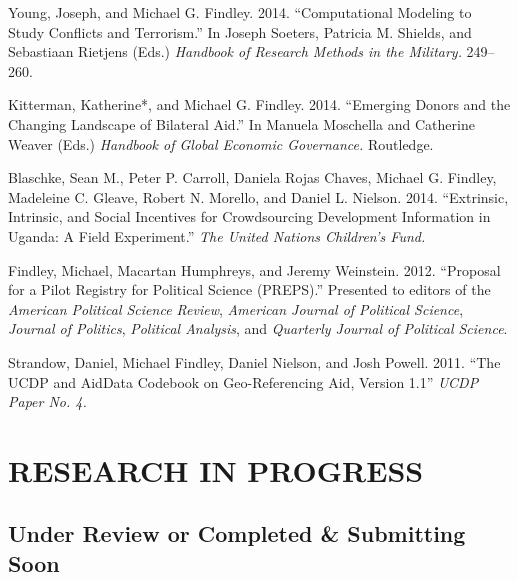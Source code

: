 \documentclass[10pt]{article}
\begin{document}
\begin{etaremune}
\item Young, Joseph, and Michael G. Findley. 2014. ``Computational Modeling to Study Conflicts and Terrorism.'' In Joseph Soeters, Patricia M. Shields, and Sebastiaan Rietjens (Eds.)  \textit{Handbook of Research Methods in the Military.} 249--260.   

\item Kitterman, Katherine*, and Michael G. Findley. 2014. ``Emerging Donors and the Changing Landscape of Bilateral Aid.'' In Manuela Moschella and Catherine Weaver (Eds.)  \textit{Handbook of Global Economic Governance.} Routledge.

\item Blaschke, Sean M., Peter P. Carroll, Daniela Rojas Chaves, Michael G. Findley, Madeleine C. Gleave, Robert N. Morello, and Daniel L. Nielson. 2014. ``Extrinsic, Intrinsic, and Social Incentives for Crowdsourcing Development Information in Uganda: A Field Experiment.'' \textit{The United Nations Children's Fund.}

\item Findley, Michael, Macartan Humphreys, and Jeremy Weinstein. 2012. ``Proposal for a Pilot Registry for Political Science (PREPS).'' Presented to editors of the \textit{American Political Science Review}, \textit{American Journal of Political Science}, \textit{Journal of Politics}, \textit{Political Analysis}, and \textit{Quarterly Journal of Political Science}.

\item Strandow, Daniel, Michael Findley, Daniel Nielson, and Josh Powell. 2011. ``The UCDP and AidData Codebook on Geo-Referencing Aid, Version 1.1'' \textit{UCDP Paper No. 4.}

\end{etaremune}


\section*{RESEARCH IN PROGRESS}


\subsection*{Under Review or Completed \& Submitting Soon}
\end{document}
